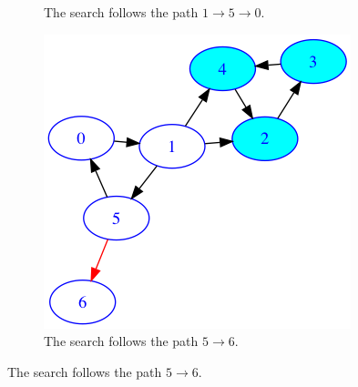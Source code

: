\begin{figure}
\begin{subfigure}{0.3\textwidth}
\caption{The search follows the path $1 \rightarrow 5 \rightarrow 0$.} \label{fig:tarjan6}
\end{subfigure}
\hspace*{\fill} %
\begin{subfigure}{0.3\textwidth}
\includegraphics[width=\linewidth]{images/tarjan/5.png}
\caption{The search follows the path $5 \rightarrow 6$.} \label{fig:tarjan5}
\end{subfigure}

\vspace{1cm}


\end{figure}

